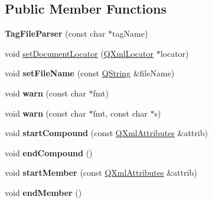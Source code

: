 \subsection*{Public Member Functions}
\begin{DoxyCompactItemize}
\item 
\mbox{\label{class_tag_file_parser_a4f139dc60355077bdb6a0c6a0ba7fd2f}} 
{\bfseries Tag\+File\+Parser} (const char $\ast$tag\+Name)
\item 
void \mbox{\hyperlink{class_tag_file_parser_a947ca98759d61b5cf3d920a7d98fa828}{set\+Document\+Locator}} (\mbox{\hyperlink{class_q_xml_locator}{Q\+Xml\+Locator}} $\ast$locator)
\item 
\mbox{\label{class_tag_file_parser_a4f993458f2f874771d87e8b4e3373925}} 
void {\bfseries set\+File\+Name} (const \mbox{\hyperlink{class_q_string}{Q\+String}} \&file\+Name)
\item 
\mbox{\label{class_tag_file_parser_acf72e17ee641ea46db2b05c6350bd1c2}} 
void {\bfseries warn} (const char $\ast$fmt)
\item 
\mbox{\label{class_tag_file_parser_afbd2e881b3cf9f30d61c62588e9e05fc}} 
void {\bfseries warn} (const char $\ast$fmt, const char $\ast$s)
\item 
\mbox{\label{class_tag_file_parser_a19aa90dae712fab6fc13b84d9b568ce5}} 
void {\bfseries start\+Compound} (const \mbox{\hyperlink{class_q_xml_attributes}{Q\+Xml\+Attributes}} \&attrib)
\item 
\mbox{\label{class_tag_file_parser_a10b74d69f1beb95fb58bcde418d78521}} 
void {\bfseries end\+Compound} ()
\item 
\mbox{\label{class_tag_file_parser_a9ce94f71fd0686afe0bb6d9ffa6dc9cb}} 
void {\bfseries start\+Member} (const \mbox{\hyperlink{class_q_xml_attributes}{Q\+Xml\+Attributes}} \&attrib)
\item 
\mbox{\label{class_tag_file_parser_aed63e6356c833e71abdf24884aee6145}} 
void {\bfseries end\+Member} ()
\item 
\mbox{\label{class_tag_file_parser_a4679fa698fea5d4896f870b28796a870}} 

\end{DoxyCompactItemize}
